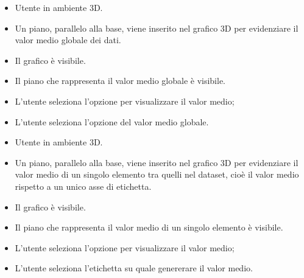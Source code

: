 \UCdsc
{ %
    \begin{itemize}
        \item Utente in ambiente 3D.
    \end{itemize}
}
{ %
    \begin{itemize}
        \item Un piano, parallelo alla base, viene inserito nel grafico 3D per evidenziare il valor medio globale dei dati.
    \end{itemize}
}
{ %
    \begin{itemize}
        \item Il grafico è visibile.
    \end{itemize}
}
{ %
    \begin{itemize}
        \item Il piano che rappresenta il valor medio globale è visibile.
    \end{itemize}
}
{ %
    \begin{itemize}
        \item L'utente seleziona l'opzione per visualizzare il valor medio;
        \item L'utente seleziona l'opzione del valor medio globale.
    \end{itemize}
}

\UCdsc
{ %
    \begin{itemize}
        \item Utente in ambiente 3D.
    \end{itemize}
}
{ %
    \begin{itemize}
        \item Un piano, parallelo alla base, viene inserito nel grafico 3D per evidenziare il valor medio di un singolo elemento tra quelli nel dataset, cioè il valor medio rispetto a un unico asse di etichetta.
    \end{itemize}
}
{ %
    \begin{itemize}
        \item Il grafico è visibile.
    \end{itemize}
}
{ %
    \begin{itemize}
        \item Il piano che rappresenta il valor medio di un singolo elemento è visibile.
    \end{itemize}
}
{ %
    \begin{itemize}
        \item L'utente seleziona l'opzione per visualizzare il valor medio;
        \item L'utente seleziona l'etichetta su quale genererare il valor medio.
    \end{itemize}
}

